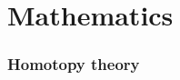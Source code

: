 \begin{coqdoccode}
\end{coqdoccode}
\part{Mathematics} \section{Homotopy theory}

\begin{coqdoccode}
\coqdocemptyline
\end{coqdoccode}
